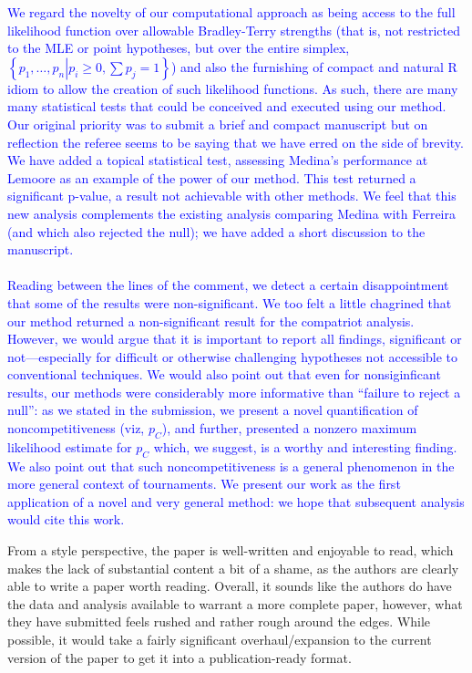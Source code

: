 \documentclass[12pt]{article}
\begin{document}
\textcolor{blue}{We regard the novelty of our computational approach
  as being access to the full likelihood function over allowable
  Bradley-Terry strengths (that is, not restricted to the MLE or point
  hypotheses, but over the entire simplex, $\left\lbrace
  p_1,\ldots,p_n\left|p_i\geq 0,\sum p_j=1\right.\right\rbrace$) and
  also the furnishing of compact and natural R idiom to allow the
  creation of such likelihood functions.  As such, there are many many
  statistical tests that could be conceived and executed using our
  method.  Our original priority was to submit a brief and compact
  manuscript but on reflection the referee seems to be saying that we
  have erred on the side of brevity.  We have added a topical
  statistical test, assessing Medina's performance at Lemoore as an
  example of the power of our method.  This test returned a
  significant p-value, a result not achievable with other methods.  We
  feel that this new analysis complements the existing analysis
  comparing Medina with Ferreira (and which also rejected the null);
  we have added a short discussion to the manuscript.  \\ \\ Reading
  between the lines of the comment, we detect a certain disappointment
  that some of the results were non-significant.  We too felt a little
  chagrined that our method returned a non-significant result for the
  compatriot analysis.  However, we would argue that it is important
  to report all findings, significant or not---especially for
  difficult or otherwise challenging hypotheses not accessible to
  conventional techniques.  We would also point out that even for
  nonsiginficant results, our methods were considerably more
  informative than ``failure to reject a null'': as we stated in the
  submission, we present a novel quantification of noncompetitiveness
  (viz, $p_C$), and further, presented a nonzero maximum likelihood
  estimate for $p_C$ which, we suggest, is a worthy and interesting
  finding.  We also point out that such noncompetitiveness is a
  general phenomenon in the more general context of tournaments.  We
  present our work as the first application of a novel and very
  general method: we hope that subsequent analysis would cite this
  work.}

From a style perspective, the paper is well-written and enjoyable to
read, which makes the lack of substantial content a bit of a shame, as
the authors are clearly able to write a paper worth reading. Overall,
it sounds like the authors do have the data and analysis available to
warrant a more complete paper, however, what they have submitted feels
rushed and rather rough around the edges. While possible, it would
take a fairly significant overhaul/expansion to the current version of
the paper to get it into a publication-ready format.
\end{document}
